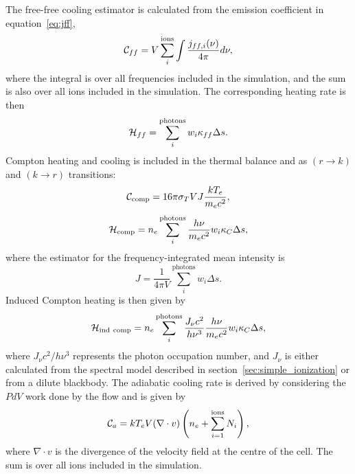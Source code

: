 The free-free cooling estimator is calculated from the emission coefficient
in equation~\ref{eq:jff},
\begin{equation}
{\cal C}_{ff} = V \sum_i^{\mathrm{ions}} \int \frac{j_{ff,i}(\nu)}{4\pi} d\nu,
\end{equation}
where the integral is over all frequencies included in the simulation,
and the sum is also over all ions included in the simulation.
The corresponding heating rate is then
\begin{equation}
{\cal H}_{ff} = \sum_i^{\mathrm{photons}} w_i \kappa_{ff} \Delta s.
\end{equation}
Compton heating and cooling is included in the thermal balance and as
$(r\rightarrow k)$ and $(k\rightarrow r)$ transitions:
\begin{equation}
{\cal C}_{\mathrm{comp}} = 16 \pi \sigma_T V J \frac{k T_e}{m_e c^2},
\end{equation}
\begin{equation}
{\cal H}_{\mathrm{comp}} = n_e \sum_i^{\mathrm{photons}} \frac{h\nu}{m_e c^2} w_i \kappa_{C}\Delta s,
\end{equation}
where the estimator for the frequency-integrated mean intensity is
\begin{equation}
J = \frac{1}{4\pi V} \sum_i^{\mathrm{photons}} w_i \Delta s.
\label{eq:j}
\end{equation}
Induced Compton heating is then given by \citep{cloudy2013}
\begin{equation}
{\cal H}_{\mathrm{ind~comp}} = n_e \sum_i^{\mathrm{photons}} \frac{J_\nu c^2}{h \nu^3} \frac{h\nu}{m_e c^2} 
w_i \kappa_{C} \Delta s,
\end{equation}
where $J_\nu c^2/h \nu^3$ represents the
photon occupation number, and $J_\nu$ is either 
calculated from the spectral model
described in section~\ref{sec:simple_ionization} or from a dilute blackbody.
The adiabatic cooling rate is derived by considering the $PdV$ work done by the flow
and is given by
\begin{equation}
{\cal C}_{a} = k T_e V (\nabla \cdot v) \left(n_e + \sum\limits_{i=1}^{\mathrm{ions}} N_i\right),
\end{equation}
where $\nabla \cdot v$ is the divergence of the 
velocity field at the centre of the cell. The sum is over all ions 
included in the simulation.

\noindent

